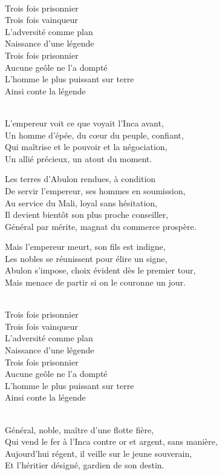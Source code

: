 \begin{lyrics}
\\
Trois fois prisonnier\\
Trois fois vainqueur\\
L'adversité comme plan\\
Naissance d'une légende\\
Trois fois prisonnier\\
Aucune geôle ne l'a dompté\\
L'homme le plus puissant sur terre\\
Ainsi conte la légende

\\
L'empereur voit ce que voyait l'Inca avant,\\
Un homme d'épée, du cœur du peuple, confiant,\\
Qui maîtrise et le pouvoir et la négociation,\\
Un allié précieux, un atout du moment.

Les terres d'Abulon rendues, à condition\\
De servir l'empereur, ses hommes en soumission,\\
Au service du Mali, loyal sans hésitation,\\
Il devient bientôt son plus proche conseiller,\\
Général par mérite, magnat du commerce prospère.

Mais l'empereur meurt, son fils est indigne,\\
Les nobles se réunissent pour élire un signe,\\
Abulon s'impose, choix évident dès le premier tour,\\
Mais menace de partir si on le couronne un jour.

\\
Trois fois prisonnier\\
Trois fois vainqueur\\
L'adversité comme plan\\
Naissance d'une légende\\
Trois fois prisonnier\\
Aucune geôle ne l'a dompté\\
L'homme le plus puissant sur terre\\
Ainsi conte la légende

\\
Général, noble, maître d'une flotte fière,\\
Qui vend le fer à l'Inca contre or et argent, sans manière,\\
Aujourd'hui régent, il veille sur le jeune souverain,\\
Et l'héritier désigné, gardien de son destin.


\end{lyrics}
